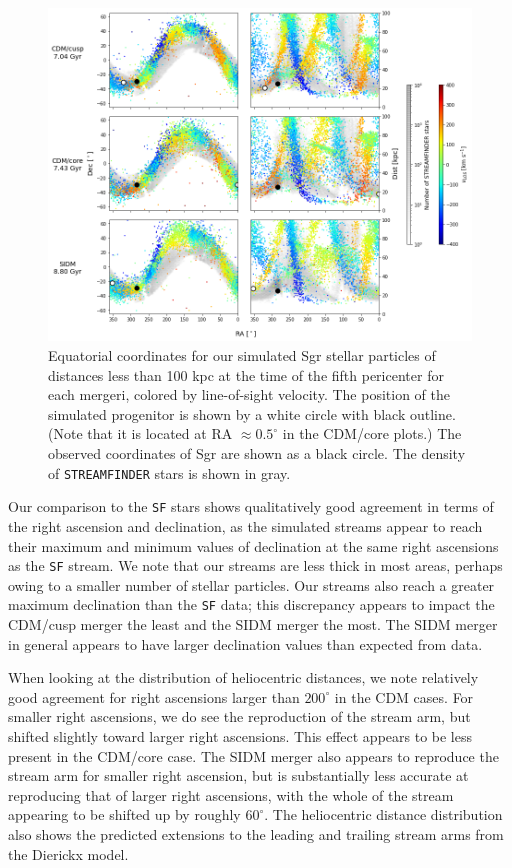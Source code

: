 \begin{figure}
    \centering 
    \includegraphics[width=1.0\linewidth]{figs/equatorial_streamfinder.png}
    \caption{%
        Equatorial coordinates for our simulated Sgr stellar particles of
        distances less than 100 kpc at the time of the fifth pericenter for
        each mergeri, colored by line-of-sight velocity.  The position of the
        simulated progenitor is shown by a white circle with black outline.
        (Note that it is located at RA $\approx 0.5^\circ$ in the CDM/core
        plots.) The observed coordinates of Sgr are shown as a black circle.
        The density of \texttt{STREAMFINDER} stars is shown in gray.
    }
    \label{fig:equatorial}
\end{figure}

Our comparison to the \verb|SF| stars shows qualitatively good agreement in
terms of the right ascension and declination, as the simulated streams appear
to reach their maximum and minimum values of declination at the same right
ascensions as the \verb|SF| stream.  We note that our streams are less thick
in most areas, perhaps owing to a smaller number of stellar particles.  Our
streams also reach a greater maximum declination than the \verb|SF| data; this
discrepancy appears to impact the CDM/cusp merger the least and the SIDM
merger the most.  The SIDM merger in general appears to have larger
declination values than expected from data.

When looking at the distribution of heliocentric distances, we note relatively
good agreement for right ascensions larger than $200^\circ$ in the CDM cases.
For smaller right ascensions, we do see the reproduction of the stream arm, but
shifted slightly toward larger right ascensions. This effect appears to be
less present in the CDM/core case. The SIDM merger also appears to reproduce the
stream arm for smaller right ascension, but is substantially less accurate at
reproducing that of larger right ascensions, with the whole of the stream
appearing to be shifted up by roughly $60^\circ$. The heliocentric distance
distribution also shows the predicted extensions to the leading and trailing
stream arms from the Dierickx model. 

